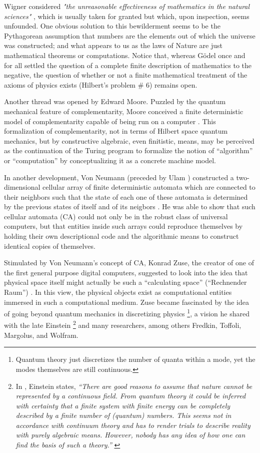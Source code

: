\documentclass[pre,preprint,showpacs,showkeys,amsfonts]{revtex4}
\begin{document}
Wigner considered
{\it "the unreasonable effectiveness of mathematics in the natural sciences"}
\cite{wigner},
which is usually taken for granted but which,
upon inspection, seems unfounded.
One obvious solution to this bewilderment seems to be the
Pythagorean assumption that numbers are
the elements out of which the universe was constructed;
and what appears to us as the laws of Nature are just
mathematical theorems or computations.
Notice that, whereas G\"odel once and for all settled the question of a complete
finite description of mathematics to the negative,
the question of whether or not a finite  mathematical treatment of the axioms of physics
exists (Hilbert's problem \# 6) remains open.

Another thread was opened by
Edward Moore.
Puzzled by the quantum mechanical feature of complementarity,
Moore
conceived a finite deterministic model of
complementarity capable of being run on a computer \cite{e-f-moore,conway}.
This formalization of complementarity, not in terms of Hilbert space quantum mechanics,
but by constructive algebraic, even finitistic, means,
may be perceived as the continuation of the Turing
program to formalize the  notion of ``algorithm'' or ``computation''
by conceptualizing it as a concrete machine model.

In another development,
Von Neumann (preceded by Ulam \cite{Ulam-50})
constructed a two-dimensional cellular array of finite deterministic automata which
are connected to their neighbors
such that the state of each one of these automata is determined by the previous states
of itself and of its neigbors \cite{v-neumann-66}.
He was able to show that such cellular automata (CA) could not only be in the
robust class of universal computers, but that entities inside such arrays could
reproduce themselves by holding their own descriptional code and the algorithmic means
to construct identical copies of themselves.

Stimulated by Von Neumann's concept of CA, Konrad Zuse,
the creator of one of the first general purpose digital computers,
suggested to look into the idea
that physical space itself might actually be such a ``calculating space''
(``Rechnender Raum'') \cite{zuse-67,zuse-69,zuse-94}.
In this view, the  physical objects exist as computational entities immersed
in such a computational medium.
Zuse became fascinated by the idea of going
beyond quantum mechanics in discretizing physics
\footnote{
Quantum theory just discretizes the number of quanta within a mode,
yet the modes themselves are still continuous.
},
a vision he shared with the late Einstein
\footnote{
In \cite[p. 163]{ein1}, Einstein states,
{\it
``There are good reasons to assume that nature cannot be represented by a continuous field. From quantum theory it could be inferred with certainty that a finite system with finite energy can be completely described by a finite number of (quantum) numbers. This seems not in accordance with continuum theory and has to render trials to describe reality with purely algebraic means. However, nobody has any idea of how one can find the basis of such a theory.''
}
}
and many researchers, among others Fredkin, Toffoli, Margolus, and Wolfram.
\end{document}
